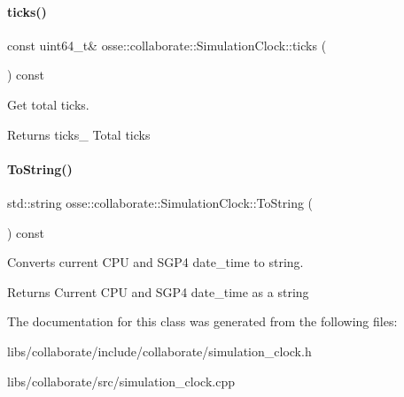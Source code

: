 \paragraph{\texorpdfstring{ticks()}{ticks()}}
{\footnotesize\ttfamily const uint64\+\_\+t\& osse\+::collaborate\+::\+Simulation\+Clock\+::ticks (\begin{DoxyParamCaption}{ }\end{DoxyParamCaption}) const\hspace{0.3cm}{\ttfamily [inline]}}



Get total ticks. 

\begin{DoxyReturn}{Returns}
ticks\+\_\+ Total ticks 
\end{DoxyReturn}
\mbox{\label{classosse_1_1collaborate_1_1_simulation_clock_a10001235cd019861c226e6d8814da638}} 
\paragraph{\texorpdfstring{To\+String()}{ToString()}}
{\footnotesize\ttfamily std\+::string osse\+::collaborate\+::\+Simulation\+Clock\+::\+To\+String (\begin{DoxyParamCaption}{ }\end{DoxyParamCaption}) const}



Converts current C\+PU and S\+G\+P4 date\+\_\+time to string. 

\begin{DoxyReturn}{Returns}
Current C\+PU and S\+G\+P4 date\+\_\+time as a string 
\end{DoxyReturn}


The documentation for this class was generated from the following files\+:\begin{DoxyCompactItemize}
\item 
libs/collaborate/include/collaborate/simulation\+\_\+clock.\+h\item 
libs/collaborate/src/simulation\+\_\+clock.\+cpp\end{DoxyCompactItemize}
